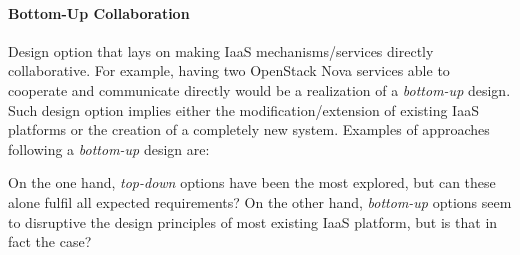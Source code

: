 \paragraph{Bottom-Up Collaboration} Design option that lays on making IaaS mechanisms/services directly collaborative. For example, having two OpenStack Nova services able to cooperate and communicate directly would be a realization of a \emph{bottom-up} design. Such design option implies either the modification/extension of existing IaaS platforms or the creation of a completely new system. Examples of approaches following a \emph{bottom-up} design are:

On the one hand, \emph{top-down} options have been the most explored, but can these alone fulfil all expected requirements? On the other hand, \emph{bottom-up} options seem to disruptive the design principles of most existing IaaS platform, but is that in fact the case?
